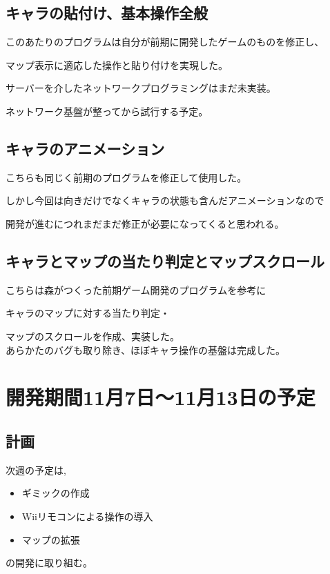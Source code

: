 \documentclass{jarticle}
\begin{document}
\subsection{キャラの貼付け、基本操作全般}
このあたりのプログラムは自分が前期に開発したゲームのものを修正し、

マップ表示に適応した操作と貼り付けを実現した。

サーバーを介したネットワークプログラミングはまだ未実装。

ネットワーク基盤が整ってから試行する予定。

\subsection{キャラのアニメーション}
こちらも同じく前期のプログラムを修正して使用した。

しかし今回は向きだけでなくキャラの状態も含んだアニメーションなので

開発が進むにつれまだまだ修正が必要になってくると思われる。

\subsection{キャラとマップの当たり判定とマップスクロール}
こちらは森がつくった前期ゲーム開発のプログラムを参考に

キャラのマップに対する当たり判定・

マップのスクロールを作成、実装した。\\

あらかたのバグも取り除き、ほぼキャラ操作の基盤は完成した。


\section{開発期間11月7日〜11月13日の予定}
\subsection{計画}
次週の予定は,
\begin{itemize}
 \item ギミックの作成
 \item Wiiリモコンによる操作の導入
 \item マップの拡張
\end{itemize}
の開発に取り組む。
\end{document}
